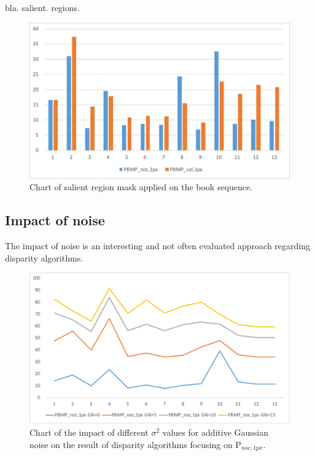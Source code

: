 \noindent bla. salient. regions.

\begin{figure}[h!]
\centering
\includegraphics[width=1.0\textwidth]{src/images/evaluation/plots/01-book-pbmp-sal-1.pdf}
\caption[Chart of salient region mask]{Chart of salient region mask applied on the book sequence.}
\label{fig:eval-plots-pbmp-sal}
\end{figure}




\subsection{Impact of noise}

The impact of noise is an interesting and not often evaluated approach regarding disparity algorithms.


\begin{figure}[h!]
\centering
\includegraphics[width=1.0\textwidth]{src/images/evaluation/plots/04-temple-gn-overview.pdf}
\caption[Chart of the impact of Gaussian noise]{Chart of the impact of different $\sigma^2$ values for additive Gaussian noise on the result of disparity algorithms focusing on P$_{noc,1px}$.}
\label{fig:eval-plots-gn-overview}
\end{figure}





